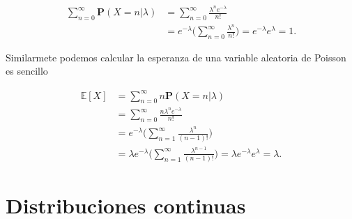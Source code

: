 \documentclass[letterpaper]{book}
\newcommand{\prob}{\textbf{P}}
\begin{document}
\begin{align*}
\sum_{n=0}^{\infty}\prob(X=n|\lambda)&=\sum_{n=0}^{\infty}\frac{\lambda^n e^{-\lambda}}{n!}\\
&=e^{-\lambda}\Big(\sum_{n=0}^{\infty}\frac{\lambda^n}{n!}\Big)=e^{-\lambda}e^{\lambda}=1.
\end{align*}

Similarmete podemos calcular la esperanza de una variable aleatoria de Poisson es sencillo

\begin{align*}
\mathbb{E}[X]&=\sum_{n=0}^{\infty}n\prob(X=n|\lambda)\\
&=\sum_{n=0}^{\infty}\frac{n\lambda^n e^{-\lambda}}{n!}\\
&=e^{-\lambda}\Big(\sum_{n=1}^{\infty}\frac{\lambda^n}{(n-1)!}\Big)\\
&=\lambda e^{-\lambda}\Big(\sum_{n=1}^{\infty}\frac{\lambda^{n-1}}{(n-1)!}\Big)=\lambda e^{-\lambda}e^{\lambda}=\lambda.
\end{align*}
\section{Distribuciones continuas}
\label{sec:orgbad89b1}
\end{document}
